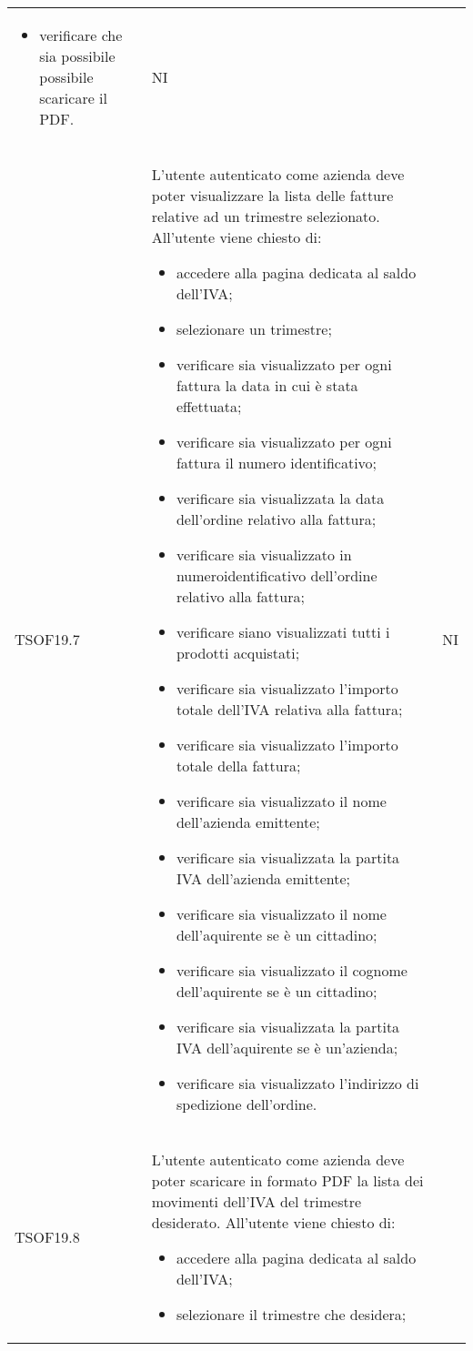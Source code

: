 \begin{table}[H]
\begin{longtable}{ >{\centering}p{} >{\centering}p{}
			>{\centering}p{}}
\begin{itemize}
			\item verificare che sia possibile possibile scaricare il PDF.
		\end{itemize}
		&	NI	\tabularnewline
		TSOF19.7	&	L'utente autenticato come azienda deve poter visualizzare la lista delle
		fatture relative ad un trimestre selezionato. All'utente viene chiesto di:
		\begin{itemize}
			\item accedere alla pagina dedicata al saldo dell'IVA;
			\item selezionare un trimestre;
			\item verificare sia visualizzato per ogni fattura la data in cui è stata
			effettuata;
			\item verificare sia visualizzato per ogni fattura il numero identificativo;
			\item verificare sia visualizzata la data dell'ordine relativo alla fattura;
			\item verificare sia visualizzato in numeroidentificativo dell'ordine 
			relativo alla fattura;
			\item verificare siano visualizzati tutti i prodotti acquistati;
			\item verificare sia visualizzato l'importo totale dell'IVA relativa alla fattura;
			\item verificare sia visualizzato l'importo totale della fattura;
			\item verificare sia visualizzato il nome dell'azienda emittente;
			\item verificare sia visualizzata la partita IVA dell'azienda emittente;
			\item verificare sia visualizzato il nome dell'aquirente se è un cittadino;
			\item verificare sia visualizzato il cognome dell'aquirente se è un cittadino;
			\item verificare sia visualizzata la partita IVA dell'aquirente se è un'azienda;
			\item verificare sia visualizzato l'indirizzo di spedizione dell'ordine.
		\end{itemize}
		&	NI	\tabularnewline
		TSOF19.8	&	L'utente autenticato come azienda deve poter scaricare in formato PDF 
		la lista dei movimenti dell'IVA del trimestre desiderato. All'utente viene chiesto 
		di:
		\begin{itemize}
			\item accedere alla pagina dedicata al saldo dell'IVA;
			\item selezionare il trimestre che desidera;

\end{itemize}
\end{longtable}
\end{table}
